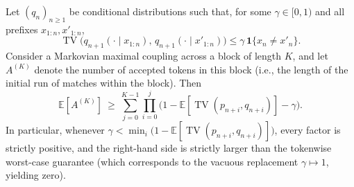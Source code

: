 \begin{theorem}\label{thm:markov-block-gain}
Let $(q_n)_{n\ge1}$ be conditional distributions such that, for some $\gamma\in[0,1)$ and all prefixes $x_{1:n},x'_{1:n}$,
\[
\operatorname{TV}\big(q_{n+1}(\cdot\mid x_{1:n}),\,q_{n+1}(\cdot\mid x'_{1:n})\big)\le \gamma\,\mathbf{1}\{x_n\ne x'_n\}.
\]
Consider a Markovian maximal coupling across a block of length $K$, and let $A^{(K)}$ denote the number of accepted tokens in this block (i.e., the length of the initial run of matches within the block). Then
\[
\mathbb{E}[A^{(K)}]\ \ge\ \sum_{j=0}^{K-1}\prod_{i=0}^{j}\Big(1-\mathbb{E}[\operatorname{TV}(p_{n+i},q_{n+i})]-\gamma\Big).
\]
In particular, whenever $\gamma<\min_i\big(1-\mathbb{E}[\operatorname{TV}(p_{n+i},q_{n+i})]\big)$, every factor is strictly positive, and the right-hand side is strictly larger than the tokenwise worst-case guarantee (which corresponds to the vacuous replacement $\gamma\mapsto1$, yielding zero).
\end{theorem}


